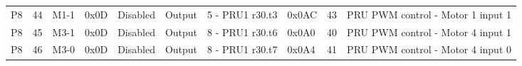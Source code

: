 \documentclass[a4paper,11pt]{article}
\begin{document}
\begin{tabular}{llllllllll}
\multicolumn{1}{c}{P8} & \multicolumn{1}{c}{44} & M1-1 & \multicolumn{1}{c}{0x0D} & \multicolumn{1}{c}{Disabled} & \multicolumn{1}{c}{Output} & 5 - PRU1 r30.t3 & 0x0AC & \multicolumn{1}{r}{43} & PRU PWM control - Motor 1 input 1 \\ 
\multicolumn{1}{c}{P8} & \multicolumn{1}{c}{45} & M3-1 & \multicolumn{1}{c}{0x0D} & \multicolumn{1}{c}{Disabled} & \multicolumn{1}{c}{Output} & 8 - PRU1 r30.t6 & 0x0A0 & \multicolumn{1}{r}{40} & PRU PWM control - Motor 4 input 1 \\ 
\multicolumn{1}{c}{P8} & \multicolumn{1}{c}{46} & M3-0 & \multicolumn{1}{c}{0x0D} & \multicolumn{1}{c}{Disabled} & \multicolumn{1}{c}{Output} & 8 - PRU1 r30.t7 & 0x0A4 & \multicolumn{1}{r}{41} & PRU PWM control - Motor 4 input 0 \\ 
\end{tabular}
\end{document}
